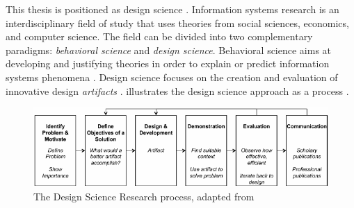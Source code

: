 This thesis is positioned as design science \citep{Hevner2004}.
Information systems research is an interdisciplinary field of study that uses theories from social sciences, economics, and computer science. The field can be divided into two complementary paradigms: \emph{behavioral science} and \emph{design science}. Behavioral science aims at developing and justifying theories in order to explain or predict information systems phenomena \cite[]{Gregor2006}. Design science focuses on the creation and evaluation of innovative design \emph{artifacts} \cite[]{Hevner2004}.  illustrates the design science approach as a process \citep{Peffers2008}. 

\begin{figure}[h]
	\centering
	\includegraphics[width=\linewidth]{figures/DS-process}
	\caption[The Design Science Research process]{The Design Science Research process, adapted from \citep{Peffers2008}}
	\label{fig:DS-process}
\end{figure}


